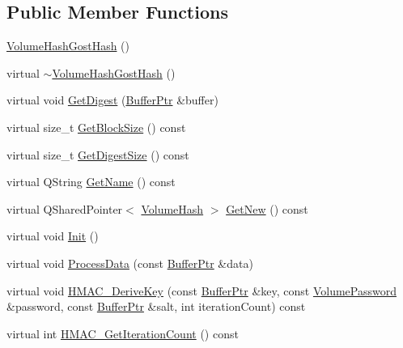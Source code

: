 \subsection*{Public Member Functions}
\begin{DoxyCompactItemize}
\item 
\hyperlink{class_gost_crypt_1_1_volume_1_1_volume_hash_gost_hash_a5704662995544f08cca7c4ed8dc354d4}{Volume\+Hash\+Gost\+Hash} ()
\item 
virtual \hyperlink{class_gost_crypt_1_1_volume_1_1_volume_hash_gost_hash_aced33d0c5b983f332a3cfea2de9eeff1}{$\sim$\+Volume\+Hash\+Gost\+Hash} ()
\item 
virtual void \hyperlink{class_gost_crypt_1_1_volume_1_1_volume_hash_gost_hash_a6973bd428bcff6dfaaa524dc825db4ca}{Get\+Digest} (\hyperlink{class_gost_crypt_1_1_buffer_ptr}{Buffer\+Ptr} \&buffer)
\item 
virtual size\+\_\+t \hyperlink{class_gost_crypt_1_1_volume_1_1_volume_hash_gost_hash_afbe58e3f3b31b065b85e5120ad1adff0}{Get\+Block\+Size} () const
\item 
virtual size\+\_\+t \hyperlink{class_gost_crypt_1_1_volume_1_1_volume_hash_gost_hash_ae81d30ef1de076a62769fde28057762e}{Get\+Digest\+Size} () const
\item 
virtual Q\+String \hyperlink{class_gost_crypt_1_1_volume_1_1_volume_hash_gost_hash_a2ee1b3df04a1ae01cfebb0049a5c6b6f}{Get\+Name} () const
\item 
virtual Q\+Shared\+Pointer$<$ \hyperlink{class_gost_crypt_1_1_volume_1_1_volume_hash}{Volume\+Hash} $>$ \hyperlink{class_gost_crypt_1_1_volume_1_1_volume_hash_gost_hash_aadbaf856de39d537036f536d24fcb8a1}{Get\+New} () const
\item 
virtual void \hyperlink{class_gost_crypt_1_1_volume_1_1_volume_hash_gost_hash_a591b1b6b6056ef1b758a841bacacc931}{Init} ()
\item 
virtual void \hyperlink{class_gost_crypt_1_1_volume_1_1_volume_hash_gost_hash_aa4e7b1f157512edc4fc184ffd5d15c27}{Process\+Data} (const \hyperlink{class_gost_crypt_1_1_buffer_ptr}{Buffer\+Ptr} \&data)
\item 
virtual void \hyperlink{class_gost_crypt_1_1_volume_1_1_volume_hash_gost_hash_a00e9f9090440a18c5a9c75a3bcc9b1a7}{H\+M\+A\+C\+\_\+\+Derive\+Key} (const \hyperlink{class_gost_crypt_1_1_buffer_ptr}{Buffer\+Ptr} \&key, const \hyperlink{class_gost_crypt_1_1_volume_1_1_volume_password}{Volume\+Password} \&password, const \hyperlink{class_gost_crypt_1_1_buffer_ptr}{Buffer\+Ptr} \&salt, int iteration\+Count) const
\item 
virtual int \hyperlink{class_gost_crypt_1_1_volume_1_1_volume_hash_gost_hash_aa77576ae688b9ca4f419dbf093ef6a75}{H\+M\+A\+C\+\_\+\+Get\+Iteration\+Count} () const
\end{DoxyCompactItemize}
